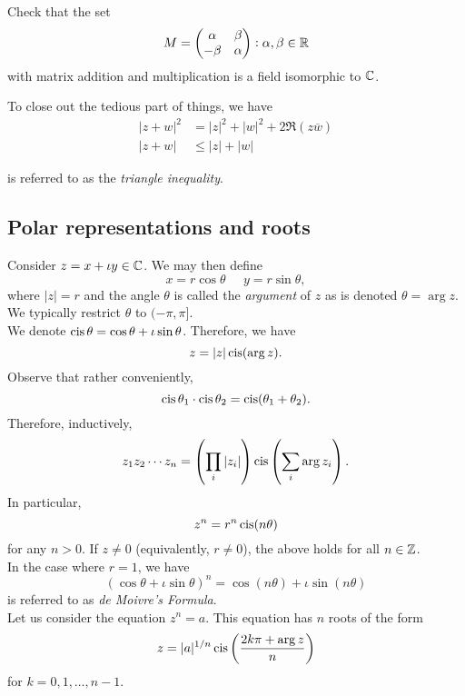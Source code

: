 	\begin{exercise}
		Check that the set
		\[ M = \begin{pmatrix} \alpha & \beta \\ -\beta & \alpha \end{pmatrix} : \alpha,\beta\in\mathbb{R} \]
		with matrix addition and multiplication is a field isomorphic to $\mathbb{C}$.
	\end{exercise}

	To close out the tedious part of things, we have
	\begin{align}
		|z+w|^2 &= |z|^2 + |w|^2 + 2 \Re(z\overline{w}) \nonumber \\
		|z+w| &\le |z| + |w| \label{eqn: triangle inequality}
	\end{align}

	 is referred to as the \emph{triangle inequality}.

\subsection{Polar representations and roots}

	Consider $z = x + \iota y \in \mathbb{C}$. We may then define
	\[ x = r\cos\theta \;\;\;\;\; y = r\sin\theta, \]
	where $|z| = r$ and the angle $\theta$ is called the \emph{argument} of $z$ as is denoted $\theta = \arg z$. We typically restrict $\theta$ to $(-\pi,\pi]$.\\
	We denote $\operatorname{cis}\theta = \cos\theta + \iota\sin\theta$. Therefore, we have
	\[ z = |z| \operatorname{cis}(\arg z). \]
	Observe that rather conveniently,
	\[ \operatorname{cis}\theta_1 \cdot \operatorname{cis}\theta_2 = \operatorname{cis}(\theta_1 + \theta_2). \]
	Therefore, inductively,
	\[ z_1 z_2 \cdots z_n = \left(\prod_{i} |z_i|\right) \operatorname{cis}\left(\sum_i \arg z_i \right). \]
	In particular,
	\[ z^n = r^n \operatorname{cis}(n\theta) \]
	for any $n > 0$. If $z \ne 0$ (equivalently, $r\ne0$), the above holds for all $n \in \mathbb{Z}$.\\
	In the case where $r=1$, we have
	\begin{equation}
		\label{eqn: de moivre's}
		(\cos\theta + \iota\sin\theta)^n = \cos(n\theta) + \iota\sin(n\theta)
	\end{equation}
	 is referred to as \emph{de Moivre's Formula}.\\

	Let us consider the equation $z^n = a$. This equation has $n$ roots of the form
	\[ z = |a|^{1/n} \operatorname{cis}\left( \frac{2k\pi + \arg z}{n} \right) \]
	for $k = 0,1,\ldots,n-1$.

